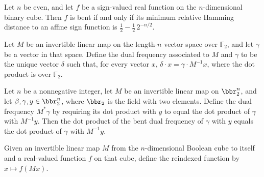 \begin{theorem}
\label{FABL.isBent_iff_distanceToAffineSigns_eq}
\leanok
{}
Let $n$ be even, and let $f$ be a sign-valued real function on the $n$-dimensional
binary cube. Then $f$ is bent if and only if its minimum relative Hamming distance to an
affine sign function is $\frac12-\frac12\,2^{-n/2}$.
\end{theorem}

\begin{definition}
\label{FABL.bentDualFrequency}
\leanok
{}
Let $M$ be an invertible linear map on the length-$n$ vector space over $\mathbb{F}_2$,
and let $\gamma$ be a vector in that space. Define the dual frequency associated to $M$
and $\gamma$ to be the unique vector $\delta$ such that, for every vector $x$,
$\delta\cdot x=\gamma\cdot M^{-1}x$, where the dot product is over $\mathbb{F}_2$.
\end{definition}

\begin{theorem}
\leanok
{}
Let $n$ be a nonnegative integer, let $M$ be an invertible linear map on $\bbr_2^n$, and
let $\beta,\gamma,y\in\bbr_2^n$, where $\bbr_2$ is the field with two elements. Define the
dual frequency $M^*\gamma$ by requiring its dot product with $y$ to equal the dot
product of $\gamma$ with $M^{-1}y$. Then the dot product of the bent dual frequency of
$\gamma$ with $y$ equals the dot product of $\gamma$ with $M^{-1}y$.
\end{theorem}

\begin{definition}
\label{FABL.bentLinearReindex}
\leanok
{}
Given an invertible linear map $M$ from the $n$-dimensional Boolean cube to itself and a
real-valued function $f$ on that cube, define the reindexed function by $x\mapsto
f(Mx)$.
\end{definition}

